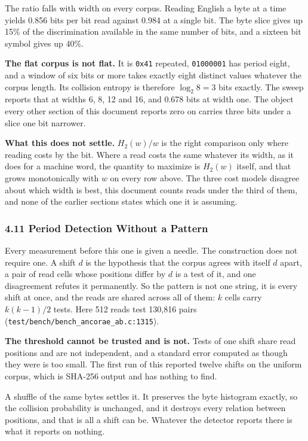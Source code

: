 The ratio falls with width on every corpus. Reading English a byte at a time yields 0.856 bits per bit read against 0.984 at a single bit. The byte slice gives up 15\% of the discrimination available in the same number of bits, and a sixteen bit symbol gives up 40\%.

\textbf{The flat corpus is not flat.} It is \texttt{0x41} repeated, \texttt{01000001} has period eight, and a window of six bits or more takes exactly eight distinct values whatever the corpus length. Its collision entropy is therefore \(\log_2 8 = 3\) bits exactly. The sweep reports that at widths 6, 8, 12 and 16, and 0.678 bits at width one. The object every other section of this document reports zero on carries three bits under a slice one bit narrower.

\textbf{What this does not settle.} \(H_2(w)/w\) is the right comparison only where reading costs by the bit. Where a read costs the same whatever its width, as it does for a machine word, the quantity to maximize is \(H_2(w)\) itself, and that grows monotonically with \(w\) on every row above. The three cost models disagree about which width is best, this document counts reads under the third of them, and none of the earlier sections states which one it is assuming.

\subsubsection{4.11 Period Detection Without a Pattern}

Every measurement before this one is given a needle. The construction does not require one. A shift \(d\) is the hypothesis that the corpus agrees with itself \(d\) apart, a pair of read cells whose positions differ by \(d\) is a test of it, and one disagreement refutes it permanently. So the pattern is not one string, it is every shift at once, and the reads are shared across all of them: \(k\) cells carry \(k(k-1)/2\) tests. Here 512 reads test 130,816 pairs (\texttt{test/\allowbreak{}bench/\allowbreak{}bench\_\allowbreak{}ancorae\_\allowbreak{}ab.\allowbreak{}c:1315}).

\textbf{The threshold cannot be trusted and is not.} Tests of one shift share read positions and are not independent, and a standard error computed as though they were is too small. The first run of this reported twelve shifts on the uniform corpus, which is SHA-256 output and has nothing to find.

A shuffle of the same bytes settles it. It preserves the byte histogram exactly, so the collision probability is unchanged, and it destroys every relation between positions, and that is all a shift can be. Whatever the detector reports there is what it reports on nothing.

